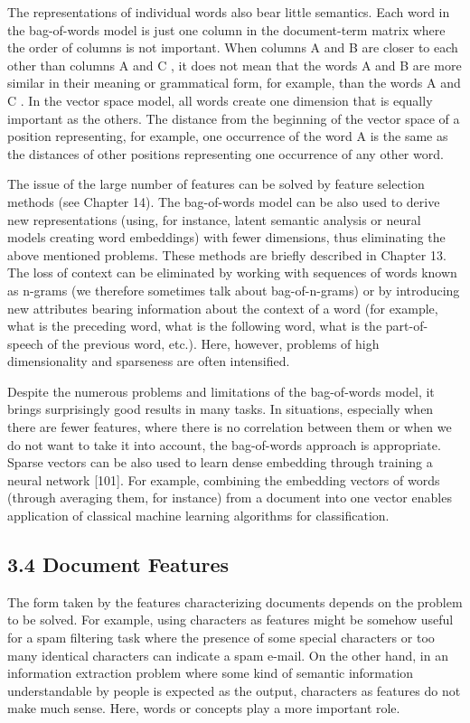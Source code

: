 \documentclass[10pt]{book}
\begin{document}
The representations of individual words also bear little semantics. Each word in the bag-of-words model is just one column in the document-term matrix where the order of columns is not important. When columns A and B are closer to each\\
other than columns A and C , it does not mean that the words A and B are more similar in their meaning or grammatical form, for example, than the words A and C . In the vector space model, all words create one dimension that is equally important as the others. The distance from the beginning of the vector space of a position representing, for example, one occurrence of the word A is the same as the distances of other positions representing one occurrence of any other word.

The issue of the large number of features can be solved by feature selection methods (see Chapter 14). The bag-of-words model can be also used to derive new representations (using, for instance, latent semantic analysis or neural models creating word embeddings) with fewer dimensions, thus eliminating the above mentioned problems. These methods are briefly described in Chapter 13. The loss of context can be eliminated by working with sequences of words known as n-grams (we therefore sometimes talk about bag-of-n-grams) or by introducing new attributes bearing information about the context of a word (for example, what is the preceding word, what is the following word, what is the part-of-speech of the previous word, etc.). Here, however, problems of high dimensionality and sparseness are often intensified.

Despite the numerous problems and limitations of the bag-of-words model, it brings surprisingly good results in many tasks. In situations, especially when there are fewer features, where there is no correlation between them or when we do not want to take it into account, the bag-of-words approach is appropriate. Sparse vectors can be also used to learn dense embedding through training a neural network [101]. For example, combining the embedding vectors of words (through averaging them, for instance) from a document into one vector enables application of classical machine learning algorithms for classification.

\subsection*{3.4 Document Features}
The form taken by the features characterizing documents depends on the problem to be solved. For example, using characters as features might be somehow useful for a spam filtering task where the presence of some special characters or too many identical characters can indicate a spam e-mail. On the other hand, in an information extraction problem where some kind of semantic information understandable by people is expected as the output, characters as features do not make much sense. Here, words or concepts play a more important role.
\end{document}
